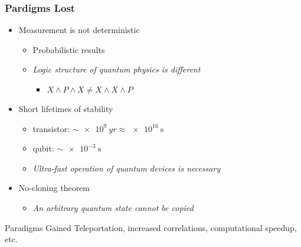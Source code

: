 
\begin{frame}
  \frametitle{Pardigms Lost}
  \begin{itemize}
  \item Measurement is not deterministic
    \begin{itemize}
    \item Probabilistic results
    \item \emph{Logic structure of quantum physics is different}
      \begin{itemize}
      \item $X \land P \land X \neq X \land X \land P$
      \end{itemize}
    \end{itemize}
  \item Short lifetimes of stability
    \begin{itemize}
    \item transistor: $\sim \SI{e9}{yr} \approx \SI{e16}{\second}$
    \item qubit: $\sim \SI{e-3}{\second}$
    \item \emph{Ultra-fast operation of quantum devices is necessary}
    \end{itemize}
  \item No-cloning theorem
    \begin{itemize}
    \item \emph{An arbitrary quantum state cannot be copied}
    \end{itemize}
  \end{itemize}
  \begin{block}{Paradigms Gained}
    Teleportation, increased correlations, computational speedup, etc.
  \end{block}
\end{frame}
